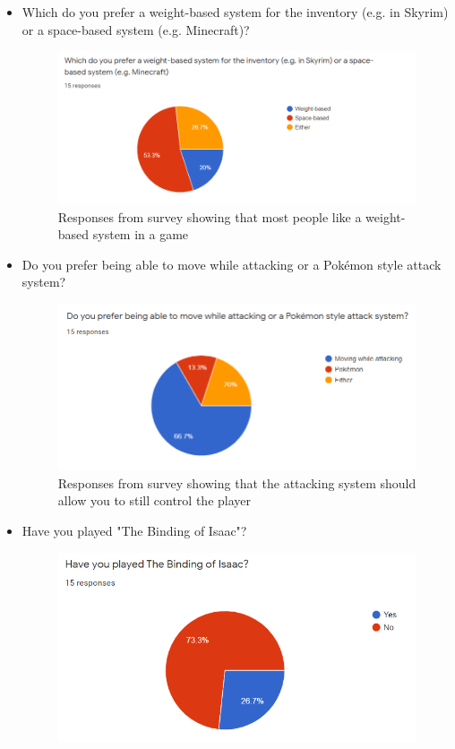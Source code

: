 \documentclass[../Main.tex]{subfiles}
\begin{document}
\begin{itemize}
                \item Which do you prefer a weight-based system for the inventory (e.g. in Skyrim) or a space-based system (e.g. Minecraft)?
                \begin{figure}[hbt!]
                    \centerline{\includegraphics[scale=1]{img/Survey/Inventory system.PNG}}
                    \caption{Responses from survey showing that most people like a weight-based system in a game}
                    \label{fig}
                \end{figure}
                \item Do you prefer being able to move while attacking or a Pokémon style attack system?
                \begin{figure}[hbt!]
                    \centerline{\includegraphics[scale=1]{img/Survey/Attacking System.PNG}}
                    \caption{Responses from survey showing that the attacking system should allow you to still control the player}
                    \label{fig}
                \end{figure}
                \clearpage
                \item Have you played "The Binding of Isaac"?
                \begin{figure}[hbt!]
                    \centerline{\includegraphics[scale=1]{img/Survey/Capture.PNG}}

\end{figure}
\end{itemize}
\end{document}
